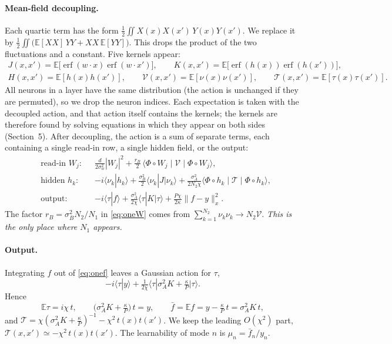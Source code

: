 \documentclass[11pt,a4paper]{article}
\newcommand{\E}{\mathbb{E}}
\newcommand{\erf}{\operatorname{erf}}
\begin{document}
\paragraph{Mean-field decoupling.}
Each quartic term has the form $\frac12\iint X(x)X(x')\,Y(x)Y(x')$.
We replace it by $\frac12\iint\big(\E[XX]\,YY+XX\,\E[YY]\big)$.
This drops the product of the two fluctuations and a constant.
Five kernels appear:
\begin{equation}
\begin{gathered}
  J(x,x')=\E\big[\erf(w\cdot x)\erf(w\cdot x')\big],\qquad
  K(x,x')=\E\big[\erf(h(x))\erf(h(x'))\big],\\
  H(x,x')=\E[h(x)h(x')],\qquad
  \mathcal V(x,x')=\E[\nu(x)\nu(x')],\qquad
  \mathcal T(x,x')=\E[\tau(x)\tau(x')].
\end{gathered}
\label{eq:kernels}
\end{equation}
All neurons in a layer have the same distribution (the action is unchanged if they are permuted), so we drop the neuron indices.
Each expectation is taken with the decoupled action, and that action itself contains the kernels; the kernels are therefore found
by solving equations in which they appear on both sides (Section~5).
After decoupling, the action is a sum of separate terms, each containing a single read-in row, a single hidden field, or the output:
\begin{align}
  &\text{read-in $W_j$:}&& \frac{d}{2\sigma_w^2}|W_j|^2+\frac{r_B}{2}\,\langle\Phi\circ W_j\mid\mathcal V\mid\Phi\circ W_j\rangle,
  \label{eq:oneW}\\
  &\text{hidden $h_k$:}&& -i\langle\nu_k|h_k\rangle+\frac{\sigma_B^2}{2}\langle\nu_k|J|\nu_k\rangle
     +\frac{\sigma_A^2}{2N_2\chi}\langle\Phi\circ h_k\mid\mathcal T\mid\Phi\circ h_k\rangle,
  \label{eq:oneh}\\
  &\text{output:}&& -i\langle\tau|f\rangle+\frac{\sigma_A^2}{2\chi}\langle\tau|K|\tau\rangle+\frac{P\chi}{2\kappa}\|f-y\|_x^2 .
  \label{eq:onef}
\end{align}
The factor $r_B=\sigma_B^2N_2/N_1$ in \eqref{eq:oneW} comes from $\sum_{k=1}^{N_2}\nu_k\nu_k\to N_2\mathcal V$.
\emph{This is the only place where $N_1$ appears.}

\paragraph{Output.}
Integrating $f$ out of \eqref{eq:onef} leaves a Gaussian action for $\tau$,
\begin{equation*}
  -i\langle\tau|y\rangle+\tfrac1{2\chi}\langle\tau|\sigma_A^2K+\tfrac\kappa P|\tau\rangle .
\end{equation*}
Hence
\begin{equation}
  \E\tau=i\chi\,t,\qquad \big(\sigma_A^2K+\tfrac\kappa P\big)\,t=y,\qquad
  \bar f=\E f=y-\tfrac\kappa P\,t=\sigma_A^2K\,t,
  \label{eq:readout}
\end{equation}
and $\mathcal T=\chi(\sigma_A^2K+\tfrac\kappa P)^{-1}-\chi^2\,t(x)t(x')$.
We keep the leading $O(\chi^2)$ part, $\mathcal T(x,x')\simeq-\chi^2\,t(x)t(x')$.
The learnability of mode $n$ is $\mu_n=\bar f_n/y_n$.
\end{document}
